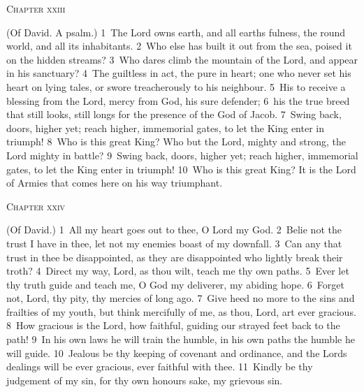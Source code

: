 \documentclass[10pt]{book} %
\begin{document}
\begin{large}\begin{center}\textsc{Chapter xxiii}\end{center}\end{large}
(Of David. A psalm.)
\textcolor{benred8}{1}~The Lord owns earth, and all earth\textquotesingle s fulness, the round world, and all its inhabitants. \textcolor{benred8}{2}~Who else has built it out from the sea, poised it on the hidden streams?
\textcolor{benred8}{3}~Who dares climb the mountain of the Lord, and appear in his sanctuary? \textcolor{benred8}{4}~The guiltless in act, the pure in heart; one who never set his heart on lying tales, or swore treacherously to his neighbour. \textcolor{benred8}{5}~His to receive a blessing from the Lord, mercy from God, his sure defender; \textcolor{benred8}{6}~his the true breed that still looks, still longs for the presence of the God of Jacob.
\textcolor{benred8}{7}~Swing back, doors, higher yet; reach higher, immemorial gates, to let the King enter in triumph! \textcolor{benred8}{8}~Who is this great King? Who but the Lord, mighty and strong, the Lord mighty in battle? \textcolor{benred8}{9}~Swing back, doors, higher yet; reach higher, immemorial gates, to let the King enter in triumph! \textcolor{benred8}{10}~Who is this great King? It is the Lord of Armies that comes here on his way triumphant.
\begin{large}\begin{center}\textsc{Chapter xxiv}\end{center}\end{large}
(Of David.)
\textcolor{benred8}{1}~All my heart goes out to thee, O Lord my God. \textcolor{benred8}{2}~Belie not the trust I have in thee, let not my enemies boast of my downfall. \textcolor{benred8}{3}~Can any that trust in thee be disappointed, as they are disappointed who lightly break their troth? \textcolor{benred8}{4}~Direct my way, Lord, as thou wilt, teach me thy own paths. \textcolor{benred8}{5}~Ever let thy truth guide and teach me, O God my deliverer, my abiding hope. \textcolor{benred8}{6}~Forget not, Lord, thy pity, thy mercies of long ago. \textcolor{benred8}{7}~Give heed no more to the sins and frailties of my youth, but think mercifully of me, as thou, Lord, art ever gracious. \textcolor{benred8}{8}~How gracious is the Lord, how faithful, guiding our strayed feet back to the path! \textcolor{benred8}{9}~In his own laws he will train the humble, in his own paths the humble he will guide. \textcolor{benred8}{10}~Jealous be thy keeping of covenant and ordinance, and the Lord\textquotesingle s dealings will be ever gracious, ever faithful with thee. \textcolor{benred8}{11}~Kindly be thy judgement of my sin, for thy own honour\textquotesingle s sake, my grievous sin.
\end{document}
